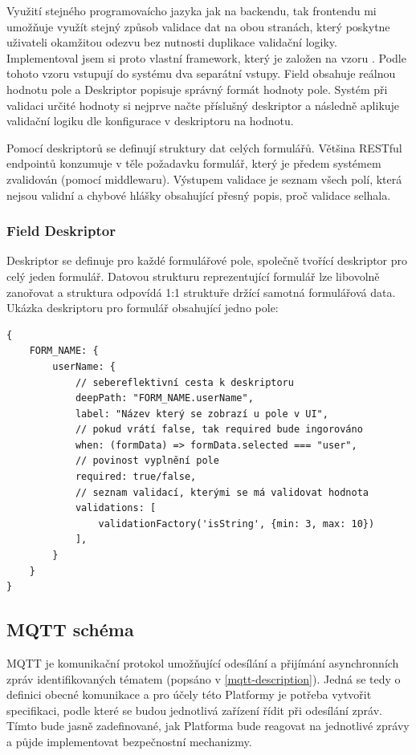 Využití stejného programovaícho jazyka jak na backendu, tak frontendu mi umožňuje využít stejný způsob validace dat na obou stranách, který poskytne uživateli okamžitou odezvu bez nutnosti duplikace validační logiky. Implementoval jsem si proto vlastní framework, který je založen na vzoru  \cite{field-descriptor-pattern}. Podle tohoto vzoru vstupují do systému dva separátní vstupy. Field obsahuje reálnou hodnotu pole a Deskriptor popisuje správný formát hodnoty pole. Systém při validaci určité hodnoty si nejprve načte příslušný deskriptor a následně aplikuje validační logiku dle konfigurace v deskriptoru na hodnotu.

Pomocí deskriptorů se definují struktury dat celých formulářů. Většina RESTful endpointů konzumuje v těle požadavku formulář, který je předem systémem zvalidován (pomocí middlewaru). Výstupem validace je seznam všech polí, která nejsou validní a chybové hlášky obsahující přesný popis, proč validace selhala.

\subsubsection{Field Deskriptor}
Deskriptor se definuje pro každé formulářové pole, společně tvořící deskriptor pro celý jeden formulář. Datovou strukturu reprezentující formulář lze libovolně zanořovat a struktura odpovídá 1:1 struktuře držící samotná formulářová data. Ukázka deskriptoru pro formulář obsahující jedno pole:

\begin{verbatim}
{
    FORM_NAME: {
        userName: {
            // sebereflektivní cesta k deskriptoru
            deepPath: "FORM_NAME.userName",        
            label: "Název který se zobrazí u pole v UI",
            // pokud vrátí false, tak required bude ingorováno
            when: (formData) => formData.selected === "user", 
            // povinost vyplnění pole 
            required: true/false,
            // seznam validací, kterými se má validovat hodnota
            validations: [
                validationFactory('isString', {min: 3, max: 10})
            ],   
        }
    }
}
\end{verbatim}


\subsection{MQTT schéma}
MQTT je komunikační protokol umožňující odesílání a přijímání asynchronních zpráv identifikovaných tématem (popsáno v \ref{mqtt-description}). Jedná se tedy o definici obecné komunikace a pro účely této Platformy je potřeba vytvořit specifikaci, podle které se budou jednotlivá zařízení řídit při odesílání zpráv. Tímto bude jasně zadefinované, jak Platforma bude reagovat na jednotlivé zprávy a půjde implementovat bezpečnostní mechanizmy.

